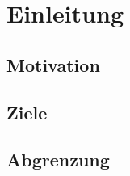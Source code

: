\chapter{Einleitung}
\label{chap:einleitung}

\section{Motivation}\label{sec:motivation}


\blindtext

\section{Ziele}\label{sec:ziele}

\blindtext

\section{Abgrenzung}

\blindtext

